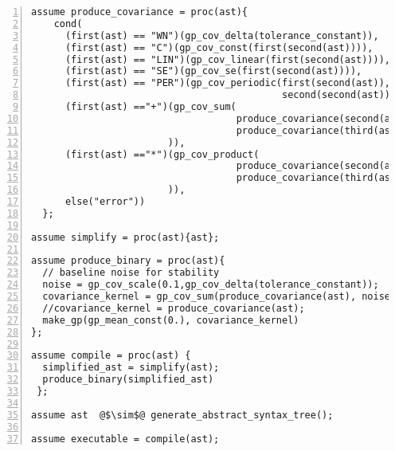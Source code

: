 \begin{mdframed}
\begin{minipage}{\linewidth}
\small
\belowcaptionskip=-10pt
\begin{lstlisting}[mathescape,label=alg:base_kernels,basicstyle=\selectfont\ttfamily,numbers=left,caption={Compilation},escapechar=\@]
assume produce_covariance = proc(ast){
    cond(
      (first(ast) == "WN")(gp_cov_delta(tolerance_constant)),
      (first(ast) == "C")(gp_cov_const(first(second(ast)))),
      (first(ast) == "LIN")(gp_cov_linear(first(second(ast)))),
      (first(ast) == "SE")(gp_cov_se(first(second(ast)))),
      (first(ast) == "PER")(gp_cov_periodic(first(second(ast)), 
                                            second(second(ast)))),
      (first(ast) =="+")(gp_cov_sum(
                                    produce_covariance(second(ast)),
                                    produce_covariance(third(ast))
                        )),
      (first(ast) =="*")(gp_cov_product(
                                    produce_covariance(second(ast)),
                                    produce_covariance(third(ast))
                        )),
      else("error"))
  };

assume simplify = proc(ast){ast};

assume produce_binary = proc(ast){
  // baseline noise for stability
  noise = gp_cov_scale(0.1,gp_cov_delta(tolerance_constant));
  covariance_kernel = gp_cov_sum(produce_covariance(ast), noise);
  //covariance_kernel = produce_covariance(ast);
  make_gp(gp_mean_const(0.), covariance_kernel)
};

assume compile = proc(ast) {
  simplified_ast = simplify(ast);
  produce_binary(simplified_ast)
 };

assume ast  @$\sim$@ generate_abstract_syntax_tree();

assume executable = compile(ast);
\end{lstlisting}
\end{minipage}
\end{mdframed}

